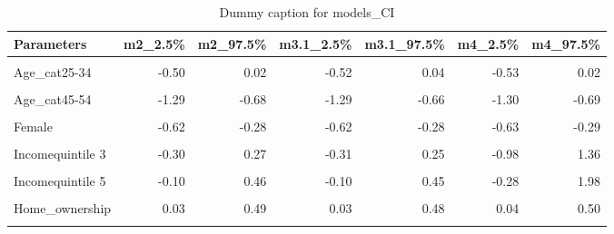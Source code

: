 \begin{table}
\centering
\caption{Dummy caption for models_CI}
\centering
\fontsize{10}{12}\selectfont
\begin{tabular}[t]{lrrrrrr}
\toprule
Parameters & m2\_2.5\% & m2\_97.5\% & m3.1\_2.5\% & m3.1\_97.5\% & m4\_2.5\% & m4\_97.5\%\\
\midrule
\cellcolor{gray!10}{(Intercept)} & \cellcolor{gray!10}{-4.29} & \cellcolor{gray!10}{-0.77} & \cellcolor{gray!10}{-3.69} & \cellcolor{gray!10}{-1.49} & \cellcolor{gray!10}{-4.25} & \cellcolor{gray!10}{-1.46}\\
Age\_cat25-34 & -0.50 & 0.02 & -0.52 & 0.04 & -0.53 & 0.02\\
\cellcolor{gray!10}{Age\_cat35-44} & \cellcolor{gray!10}{-1.18} & \cellcolor{gray!10}{-0.57} & \cellcolor{gray!10}{-1.18} & \cellcolor{gray!10}{-0.56} & \cellcolor{gray!10}{-1.21} & \cellcolor{gray!10}{-0.58}\\
Age\_cat45-54 & -1.29 & -0.68 & -1.29 & -0.66 & -1.30 & -0.69\\
\cellcolor{gray!10}{Age\_cat55+} & \cellcolor{gray!10}{-1.03} & \cellcolor{gray!10}{-0.54} & \cellcolor{gray!10}{-1.04} & \cellcolor{gray!10}{-0.53} & \cellcolor{gray!10}{-1.02} & \cellcolor{gray!10}{-0.52}\\
Female & -0.62 & -0.28 & -0.62 & -0.28 & -0.63 & -0.29\\
\cellcolor{gray!10}{Incomequintile 2} & \cellcolor{gray!10}{-0.30} & \cellcolor{gray!10}{0.27} & \cellcolor{gray!10}{-0.29} & \cellcolor{gray!10}{0.28} & \cellcolor{gray!10}{-1.29} & \cellcolor{gray!10}{1.19}\\
Incomequintile 3 & -0.30 & 0.27 & -0.31 & 0.25 & -0.98 & 1.36\\
\cellcolor{gray!10}{Incomequintile 4} & \cellcolor{gray!10}{-0.24} & \cellcolor{gray!10}{0.34} & \cellcolor{gray!10}{-0.23} & \cellcolor{gray!10}{0.33} & \cellcolor{gray!10}{-1.25} & \cellcolor{gray!10}{1.12}\\
Incomequintile 5 & -0.10 & 0.46 & -0.10 & 0.45 & -0.28 & 1.98\\
\cellcolor{gray!10}{Higher\_edu} & \cellcolor{gray!10}{-0.04} & \cellcolor{gray!10}{0.32} & \cellcolor{gray!10}{-0.04} & \cellcolor{gray!10}{0.32} & \cellcolor{gray!10}{-0.05} & \cellcolor{gray!10}{0.32}\\
Home\_ownership & 0.03 & 0.49 & 0.03 & 0.48 & 0.04 & 0.50\\
\cellcolor{gray!10}{Dwelling\_house} & \cellcolor{gray!10}{-0.35} & \cellcolor{gray!10}{0.10} & \cellcolor{gray!10}{-0.35} & \cellcolor{gray!10}{0.11} & \cellcolor{gray!10}{-0.35} & \cellcolor{gray!10}{0.09}\\

\end{tabular}
\end{table}
